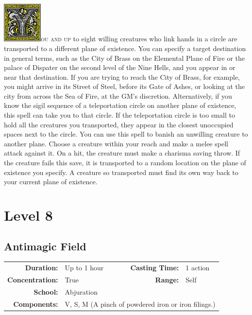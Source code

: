 \documentclass[12pt,showtrims]{memoir}
\begin{document}
\vspace{1\baselineskip}\noindent
\lettrine[lines=4]{\includegraphics[height=58pt]{initials/Y.png}}{ou and up} to eight willing creatures who link hands in a circle are transported to a different plane of existence. You can specify a target destination in general terms, such as the City of Brass on the Elemental Plane of Fire or the palace of Dispater on the second level of the Nine Hells, and you appear in or near that destination. If you are trying to reach the City of Brass, for example, you might arrive in its Street of Steel, before its Gate of Ashes, or looking at the city from across the Sea of Fire, at the GM's discretion. Alternatively, if you know the sigil sequence of a teleportation circle on another plane of existence, this spell can take you to that circle. If the teleportation circle is too small to hold all the creatures you transported, they appear in the closest unoccupied spaces next to the circle. You can use this spell to banish an unwilling creature to another plane. Choose a creature within your reach and make a melee spell attack against it. On a hit, the creature must make a charisma saving throw. If the creature fails this save, it is transported to a random location on the plane of existence you specify. A creature so transported must find its own way back to your current plane of existence.

\newpage
\chapter*{Level 8} 
\section*{Antimagic Field}

{
\small\centering\vspace{-6pt}
\begin{tabular}{rlrl}
\toprule

\textbf{Duration:} & Up to 1 hour &
\textbf{Casting Time:} & 1 action \\
\textbf{Concentration:} & True &
\textbf{Range:} & Self \\
\textbf{School:} & Abjuration \\
\textbf{Components:} & \multicolumn{3}{p{0.7\textwidth}}{V, S, M (A pinch of powdered iron or iron filings.)}\\

\bottomrule
\end{tabular}
}
\end{document}
